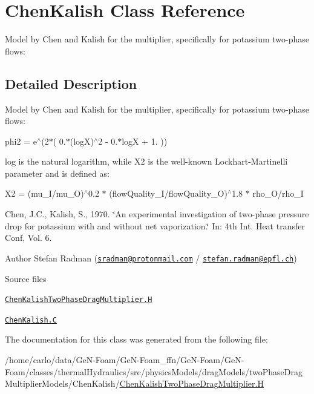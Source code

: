 \hypertarget{classFoam_1_1ChenKalish}{}\section{Chen\+Kalish Class Reference}
\label{classFoam_1_1ChenKalish}


Model by Chen and Kalish for the multiplier, specifically for potassium two-\/phase flows\+:  




\subsection{Detailed Description}
Model by Chen and Kalish for the multiplier, specifically for potassium two-\/phase flows\+: 

\label{_Description}%
 phi2 = e$^\wedge$(2$\ast$( 0.$\ast$(logX)$^\wedge$2 -\/ 0.$\ast$logX + 1. ))

log is the natural logarithm, while X2 is the well-\/known Lockhart-\/\+Martinelli parameter and is defined as\+:

X2 = (mu\+\_\+\+I/mu\+\_\+O)$^\wedge$0.2 $\ast$ (flow\+Quality\+\_\+\+I/flow\+Quality\+\_\+O)$^\wedge$1.8 $\ast$ rho\+\_\+\+O/rho\+\_\+I

Chen, J.\+C., Kalish, S., 1970. \char`\"{}\+An experimental investigation of two-\/phase
pressure drop for potassium with and without net vaporization.\char`\"{} In\+: 4th Int. Heat transfer Conf, Vol. 6.

Author Stefan Radman (\href{mailto:sradman@protonmail.com}{\tt sradman@protonmail.\+com} / \href{mailto:stefan.radman@epfl.ch}{\tt stefan.\+radman@epfl.\+ch})

\begin{DoxyParagraph}{Source files}

\begin{DoxyItemize}
\item \href{../../../home/carlo/data/GeN-Foam/GeN-Foam_ffn/GeN-Foam/GeN-Foam/classes/thermalHydraulics/src/physicsModels/dragModels/twoPhaseDragMultiplierModels/ChenKalish/ChenKalishTwoPhaseDragMultiplier.H}{\tt Chen\+Kalish\+Two\+Phase\+Drag\+Multiplier.\+H} 
\item \href{../../../home/carlo/data/GeN-Foam/GeN-Foam_ffn/GeN-Foam/GeN-Foam/classes/thermalHydraulics/src/physicsModels/dragModels/twoPhaseDragMultiplierModels/ChenKalish/ChenKalish.C}{\tt Chen\+Kalish.\+C} 
\end{DoxyItemize}
\end{DoxyParagraph}


The documentation for this class was generated from the following file\+:\begin{DoxyCompactItemize}
\item 
/home/carlo/data/\+Ge\+N-\/\+Foam/\+Ge\+N-\/\+Foam\+\_\+ffn/\+Ge\+N-\/\+Foam/\+Ge\+N-\/\+Foam/classes/thermal\+Hydraulics/src/physics\+Models/drag\+Models/two\+Phase\+Drag\+Multiplier\+Models/\+Chen\+Kalish/\hyperlink{ChenKalishTwoPhaseDragMultiplier_8H}{Chen\+Kalish\+Two\+Phase\+Drag\+Multiplier.\+H}\end{DoxyCompactItemize}

